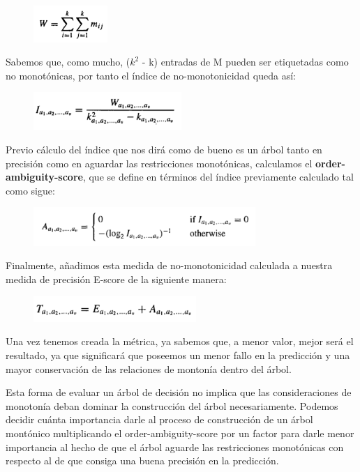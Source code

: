\begin{figure}[H]
	\centering
	\includegraphics[width=0.25\textwidth]{imagenes/wsum} 
\end{figure}

Sabemos que, como mucho, ($k^2$ - k) entradas de M pueden ser etiquetadas como no monotónicas, por tanto el índice de no-monotonicidad queda así:

\begin{figure}[H]
	\centering
	\includegraphics[width=0.5\textwidth]{imagenes/inm} 
\end{figure}

Previo cálculo del índice que nos dirá como de bueno es un árbol tanto en precisión como en aguardar las restricciones monotónicas, calculamos el \textbf{order-ambiguity-score}, que se define en términos del índice previamente calculado tal como sigue:

\begin{figure}[H]
	\centering
	\includegraphics[width=0.75\textwidth]{imagenes/oas} 
\end{figure}

Finalmente, añadimos esta medida de no-monotonicidad calculada a nuestra medida de precisión E-score de la siguiente manera:

\begin{figure}[H]
	\centering
	\includegraphics[width=0.55\textwidth]{imagenes/tas} 
\end{figure}

Una vez tenemos creada la métrica, ya sabemos que, a menor valor, mejor será el resultado, ya que significará que poseemos un menor fallo en la predicción y una mayor conservación de las relaciones de montonía dentro del árbol.

Esta forma de evaluar un árbol de decisión no implica que las consideraciones de monotonía deban dominar la construcción del árbol necesariamente. Podemos decidir cuánta importancia darle al proceso de construcción de un árbol montónico multiplicando el order-ambiguity-score por un factor para darle menor importancia al hecho de que el árbol aguarde las restricciones monotónicas con respecto al de que consiga una buena precisión en la predicción. \cite{ref14}

\newpage


